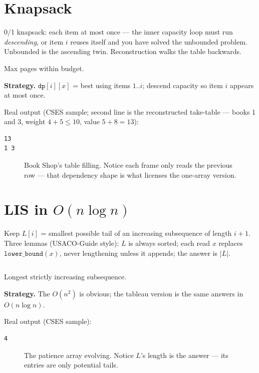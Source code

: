 \section{Knapsack}\label{sec:knap}
0/1 knapsack: each item at most once --- the inner capacity loop must
run \emph{descending}, or item $i$ reuses itself and you have solved
the unbounded problem. Unbounded is the ascending twin.
Reconstruction walks the table backwards.
\begin{example}\label{ex:shop}
Max pages within budget.
\par\smallskip
\textbf{Strategy.} $\texttt{dp}[i][x]$ = best using items $1..i$;
descend capacity so item $i$ appears at most once.
\par\smallskip
\begin{solution}

Real output (CSES sample; second line is the reconstructed
take-table --- books 1 and 3, weight $4+5\le 10$, value $5+8=13$):
\begin{lstlisting}[numbers=none]
13
1 3
\end{lstlisting}
\end{solution}
\end{example}
\begin{figure}[ht]\centering

\caption{Book Shop's table filling. Notice each frame only reads the
previous row --- that dependency shape is what licenses the
one-array version.}
\label{fig:dpfill}
\end{figure}

\section{LIS in \texorpdfstring{$O(n\log n)$}{O(n log n)}}\label{sec:lis}
Keep $L[i]$ = smallest possible tail of an increasing subsequence of
length $i{+}1$. Three lemmas (USACO-Guide style): $L$ is always
sorted; each read $x$ replaces $\texttt{lower\_bound}(x)$, never
lengthening unless it appends; the answer is $|L|$.
\begin{lstlisting}[language=C++,caption={\texttt{lis.h}: the
7-line core.},label={lst:lis}]
\end{lstlisting}

\begin{example}\label{ex:lis}
Longest strictly increasing subsequence.
\par\smallskip
\textbf{Strategy.} The $O(n^2)$ is obvious; the tableau version is
the same answers in $O(n\log n)$.
\par\smallskip
\begin{solution}

Real output (CSES sample):
\begin{lstlisting}[numbers=none]
4
\end{lstlisting}
\end{solution}
\end{example}
\begin{figure}[ht]\centering

\caption{The patience array evolving. Notice $L$'s length is the
answer --- its entries are only potential tails.}
\label{fig:patience}
\end{figure}

